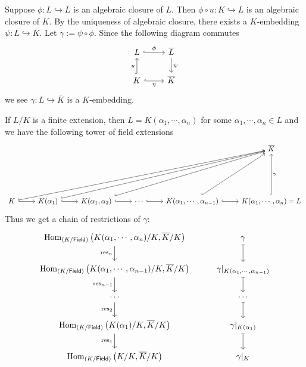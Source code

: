 \begin{prf}
    Suppose $\phi:L\hookrightarrow \overline{L}$ is an algebraic closure of $L$. Then $\phi\circ u: K\hookrightarrow \overline{L}$ is an algebraic closure of $K$. By the uniqueness of algebraic closure, there exists a $K$-embedding $\psi:L\hookrightarrow \overline{K}$. Let $\gamma:=\psi\circ \phi$. Since the following diagram commutes
    \[
        \begin{tikzcd}
            L \arrow[r, "\phi", hook]                       & \overline{L} \arrow[d, "\psi"] \\
            K \arrow[u, "u", hook] \arrow[r, "\eta"', hook] & \overline{K}                  
            \end{tikzcd}
    \]
    we see $\gamma:L\hookrightarrow \overline{K}$ is a $K$-embedding.

    If $L/K$ is a finite extension, then $L=K(\alpha_1,\cdots,\alpha_n)$ for some $\alpha_1,\cdots,\alpha_n\in L$ and we have the following tower of field extensions
    \[
        \begin{tikzcd}
            &                                                 &                                                           &                        &                                                                    & \overline{K}                                    \\[+4em]
K \arrow[r, hook] \arrow[rrrrru, hook] & K(\alpha_1) \arrow[r, hook] \arrow[rrrru, hook] & {K(\alpha_1,\alpha_2)} \arrow[r, hook] \arrow[rrru, hook] & \cdots \arrow[r, hook] & {K(\alpha_1,\cdots,\alpha_{n-1})} \arrow[r, hook] \arrow[ru, hook] & {K(\alpha_1,\cdots,\alpha_n)=L} \arrow[u, "\gamma"', hook]
\end{tikzcd}
    \]
    Thus we get a chain of restrictions of $\gamma$:
    \[
        \begin{tikzcd}
            {\mathrm{Hom}_{(K/\mathsf{Field})}\left(K(\alpha_1,\cdots,\alpha_n)/K,\overline{K}/K\right)} \arrow[d, "\mathrm{res}_n"']         & \gamma \arrow[d, maps to]                                      \\
            {\mathrm{Hom}_{(K/\mathsf{Field})}\left(K(\alpha_1,\cdots,\alpha_{n-1})/K,\overline{K}/K\right)} \arrow[d, "\mathrm{res}_{n-1}"'] & {\gamma|_{K(\alpha_1,\cdots,\alpha_{n-1})}} \arrow[d, maps to] \\
            \cdots \arrow[d, "\mathrm{res}_{2}"']                                                                                                 & \cdots \arrow[d,maps to]                                      \\
            {\mathrm{Hom}_{(K/\mathsf{Field})}\left(K(\alpha_1)/K,\overline{K}/K\right)} \arrow[d, "\mathrm{res}_1"']                         & \gamma|_{K(\alpha_1)} \arrow[d, maps to]                       \\
            {\mathrm{Hom}_{(K/\mathsf{Field})}\left(K/K,\overline{K}/K\right)}                                                                & \gamma|_{K}                                                   
            \end{tikzcd}
    \]
\end{prf}

